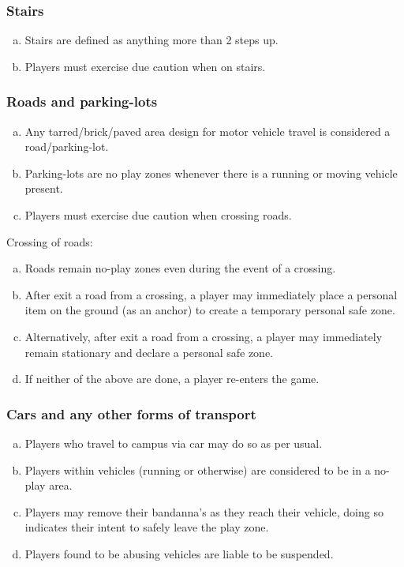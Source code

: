 \documentclass[a4paper,12pt]{article}
\begin{document}
\subsubsection{Stairs}
\begin{enumerate}[(a)]
    \item Stairs are defined as anything more than 2 steps up.
    \item Players must exercise due caution when on stairs.
\end{enumerate}

\subsubsection{Roads and parking-lots}
\begin{enumerate}[(a)]
    \item Any tarred/brick/paved area design for motor vehicle travel is considered a road/parking-lot.
    \item Parking-lots are no play zones whenever there is a running or moving vehicle present.
    \item Players must exercise due caution when crossing roads.
\end{enumerate}

Crossing of roads:
\begin{enumerate}[(a)]
    \item Roads remain no-play zones even during the event of a crossing.
    \item After exit a road from a crossing, a player may immediately place a personal item on the ground (as an anchor) to create a temporary personal safe zone.
    \item Alternatively, after exit a road from a crossing, a player may immediately remain stationary and declare a personal safe zone.
 	\item If neither of the above are done, a player re-enters the game.
\end{enumerate}

\subsubsection{Cars and any other forms of transport}
\begin{enumerate}[(a)]
    \item Players who travel to campus via car may do so as per usual.
    \item Players within vehicles (running or otherwise) are considered to be in a no-play area.
    \item Players may remove their bandanna's as they reach their vehicle, doing so indicates their intent to safely leave the play zone.
    \item Players found to be abusing vehicles are liable to be suspended.
\end{enumerate}
\end{document}
